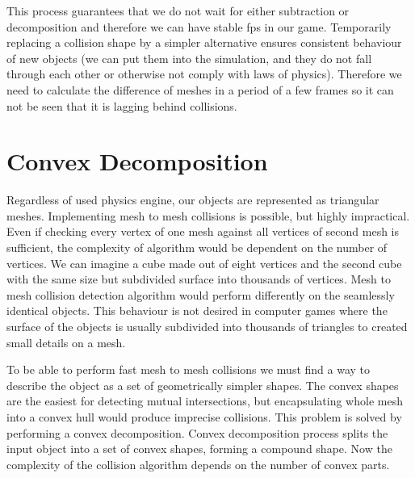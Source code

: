 This process guarantees that we do not wait for either subtraction or decomposition and therefore we can have stable fps in our game. Temporarily replacing a collision shape by a simpler alternative ensures consistent behaviour of new objects (we can put them into the simulation, and they do not fall through each other or otherwise not comply with laws of physics). Therefore we need to calculate the difference of meshes in a period of a few frames so it can not be seen that it is lagging behind collisions.

\section{Convex Decomposition}
\label{sec:decomposition}
Regardless of used physics engine, our objects are represented as triangular meshes. Implementing mesh to mesh collisions is possible, but highly impractical. Even if checking every vertex of one mesh against all vertices of second mesh is sufficient, the complexity of algorithm would be dependent on the number of vertices. We can imagine a cube made out of eight vertices and the second cube with the same size but subdivided surface into thousands of vertices. Mesh to mesh collision detection algorithm would perform differently on the seamlessly identical objects. This behaviour is not desired in computer games where the surface of the objects is usually subdivided into thousands of triangles to created small details on a mesh.

To be able to perform fast mesh to mesh collisions we must find a way to describe the object as a set of geometrically simpler shapes. The convex shapes are the easiest for detecting mutual intersections, but encapsulating whole mesh into a convex hull would produce imprecise collisions. This problem is solved by performing a convex decomposition. Convex decomposition process splits the input object into a set of convex shapes, forming a compound shape. Now the complexity of the collision algorithm depends on the number of convex parts. 

